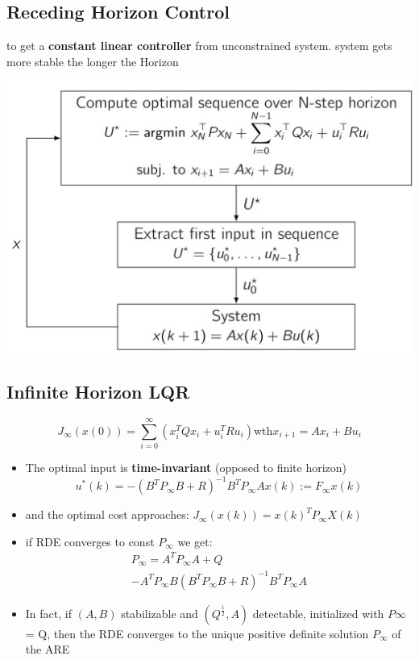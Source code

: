 \subsection{Receding Horizon Control}
to get a \textbf{constant linear controller} from unconstrained system. system gets more stable the longer the Horizon
\begin{center}
\includegraphics[width = 0.5\linewidth]{MPC_summary/Images/Screenshot 2021-07-31 170253.jpg}
\end{center}

\subsection{Infinite Horizon LQR}
\[\boxed{J_\infty(x(0)) = \sum ^\infty _{i=0}(x_i^TQx_i+ u_i^TRu_i) \mathrm{wth} x_{i+1} = Ax_i+Bu_i}\]
\begin{itemize}
    \item The optimal input is \textbf{time-invariant} (opposed to finite horizon)\[u^*(k) = -(B^TP_\infty B + R )^{-1}B^TP_\infty A x(k) := F_\infty x(k)\]
    \item and the optimal cost approaches: $J_\infty(x(k))=x(k)^TP_\infty X(k)$
    \item if RDE converges to const $P_\infty$ we get: \begin{gather*}P_\infty=A^TP_\infty A + Q \\- A^TP_\infty B(B^TP_\infty B+R)^{-1} B^TP_\infty A\end{gather*}
    \item In fact, if $(A,B)$ stabilizable and $(Q^\frac{1}{2},A)$
 detectable, initialized with $P\infty$ = Q, then the RDE converges to the unique positive definite solution $P_\infty$ of the ARE\end{itemize}


